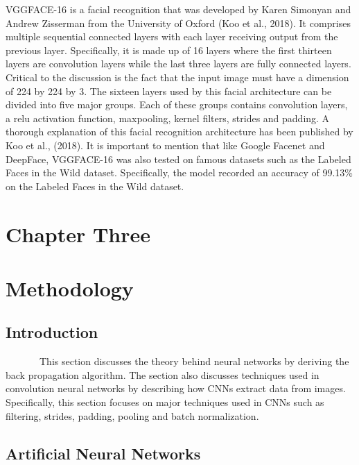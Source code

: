 \documentclass[
  12pt,
]{report}
\begin{document}
VGGFACE-16 is a facial recognition that was developed by Karen Simonyan
and Andrew Zisserman from the University of Oxford (Koo et al., 2018).
It comprises multiple sequential connected layers with each layer
receiving output from the previous layer. Specifically, it is made up of
16 layers where the first thirteen layers are convolution layers while
the last three layers are fully connected layers. Critical to the
discussion is the fact that the input image must have a dimension of 224
by 224 by 3. The sixteen layers used by this facial architecture can be
divided into five major groups. Each of these groups contains
convolution layers, a relu activation function, maxpooling, kernel
filters, strides and padding. A thorough explanation of this facial
recognition architecture has been published by Koo et al., (2018). It is
important to mention that like Google Facenet and DeepFace, VGGFACE-16
was also tested on famous datasets such as the Labeled Faces in the Wild
dataset. Specifically, the model recorded an accuracy of 99.13\% on the
Labeled Faces in the Wild dataset.

\newpage

\onehalfspacing
\normalsize
\justifying

\chapter{Chapter Three}\label{chapter-three}

\vspace{-1em}

\chapter*{Methodology}\label{methodology}

\section{Introduction}\label{introduction-2}

~~~~~~~This section discusses the theory behind neural networks by
deriving the back propagation algorithm. The section also discusses
techniques used in convolution neural networks by describing how CNNs
extract data from images. Specifically, this section focuses on major
techniques used in CNNs such as filtering, strides, padding, pooling and
batch normalization.

\section{Artificial Neural Networks}\label{artificial-neural-networks}
\end{document}
